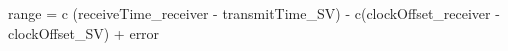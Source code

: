 range = c (receiveTime_{receiver} - transmitTime_{SV}) - c(clockOffset_{receiver} - clockOffset_{SV}) + error